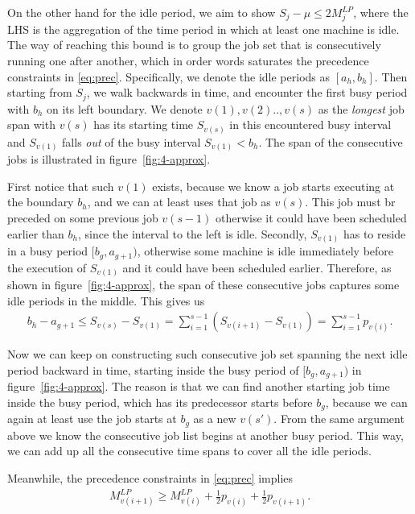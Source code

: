 On the other hand for the idle period, we aim to show $S_j - \mu \leq 2 M^{LP}_j$, where the LHS is the aggregation of the time period in which at least one machine is idle. The way of reaching this bound is to group the job set that is consecutively running one after another, which in order words saturates the precedence constraints in \eqref{eq:prec}. Specifically, we denote the idle periods as $[a_h, b_h]$. Then starting from $S_j$, we walk backwards in time, and encounter the first busy period with $b_h$ on its left boundary. We denote $v(1), v(2) .., v(s)$ as the \emph{longest} job span with $v(s)$ has its starting time $S_{v(s)}$ in this encountered busy interval and $S_{v(1)}$ falls \emph{out} of the busy interval $S_{v(1)} < b_h$. The span of the consecutive jobs is illustrated in figure~\ref{fig:4-approx}. 

First notice that such $v(1)$ exists, because we know a job starts executing at the boundary $b_h$, and we can at least uses that job as $v(s)$. This job must br preceded on some previous job $v(s-1)$ otherwise it could have been scheduled earlier than $b_h$, since the interval to the left is idle. Secondly, $S_{v(1)}$ has to reside in a busy period $[b_g, a_{g+1})$, otherwise some machine is idle immediately before the execution of $S_{v(1)}$ and it could have been scheduled earlier. Therefore, as shown in figure~\ref{fig:4-approx}, the span of these consecutive jobs captures some idle periods in the middle. This gives us 
\begin{align}
b_h - a_{g+1} \leq S_{v(s)} - S_{v(1)} = \sum_{i=1}^{s-1}(S_{v(i+1)} - S_{v(1)}) = \sum_{i=1}^{s-1} p_{v(i)}. \label{eq:jobset}
\end{align}

Now we can keep on constructing such consecutive job set spanning the next idle period backward in time, starting inside the busy period of $[b_g, a_{g+1})$ in figure~\ref{fig:4-approx}. The reason is that we can find another starting job time inside the busy period, which has its predecessor starts before $b_g$, because we can again at least use the job starts at $b_g$ as a new $v(s')$. From the same argument above we know the consecutive job list begins at another busy period. This way, we can add up all the consecutive time spans to cover all the idle periods. 

Meanwhile, the precedence constraints in \eqref{eq:prec} implies
\begin{align}
M^{LP}_{v(i+1)} \geq M^{LP}_{v(i)} + \frac{1}{2}p_{v(i)} + \frac{1}{2}p_{v(i+1)}. \label{eq:prec2}
\end{align}

